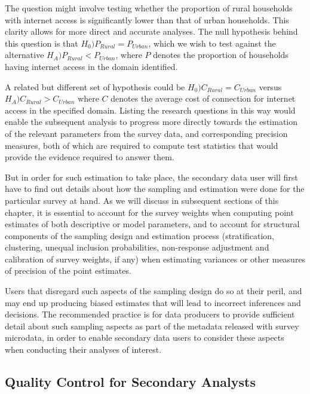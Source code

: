 \documentclass[
  12pt,
]{book}
\begin{document}
The question might involve testing whether the proportion of rural households with internet access is significantly lower than that of urban households. This clarity allows for more direct and accurate analyses. The null hypothesis behind this question is that \(H_0) P_{Rural} = P_{Urban}\), which we wish to test against the alternative \(H_A) P_{Rural} < P_{Urban}\), where \(P\) denotes the proportion of households having internet access in the domain identified.

A related but different set of hypothesis could be \(H_0) C_{Rural} = C_{Urban}\) versus \(H_A) C_{Rural} > C_{Urban}\) where \(C\) denotes the average cost of connection for internet access in the specified domain. Listing the research questions in this way would enable the subsequent analysis to progress more directly towards the estimation of the relevant parameters from the survey data, and corresponding precision measures, both of which are required to compute test statistics that would provide the evidence required to answer them.

But in order for such estimation to take place, the secondary data user will first have to find out details about how the sampling and estimation were done for the particular survey at hand. As we will discuss in subsequent sections of this chapter, it is essential to account for the survey weights when computing point estimates of both descriptive or model parameters, and to account for structural components of the sampling design and estimation process (stratification, clustering, unequal inclusion probabilities, non-response adjustment and calibration of survey weights, if any) when estimating variances or other measures of precision of the point estimates.

Users that disregard such aspects of the sampling design do so at their peril, and may end up producing biased estimates that will lead to incorrect inferences and decisions. The recommended practice is for data producers to provide sufficient detail about such sampling aspects as part of the metadata released with survey microdata, in order to enable secondary data users to consider these aspects when conducting their analyses of interest.

\hypertarget{quality-control-for-secondary-analysts}{%
\subsection{Quality Control for Secondary Analysts}\label{quality-control-for-secondary-analysts}}
\end{document}
